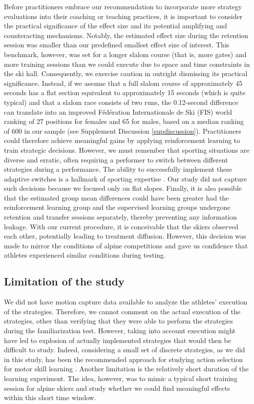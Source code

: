 \documentclass[pdflatex,sn-nature]{sn-jnl}%
\theoremstyle{thmstyleone}%
\theoremstyle{thmstyletwo}%
\theoremstyle{thmstylethree}%
\begin{document}
Before practitioners embrace our recommendation to incorporate more strategy evaluations into their coaching or teaching practices, it is important to consider the practical significance of the effect size and its potential amplifying and counteracting mechanisms\cite{anvari_not_2023}. Notably, the estimated effect size during the retention session was smaller than our predefined smallest effect size of interest. This benchmark, however, was set for a longer slalom course (that is, more gates) and more training sessions than we could execute due to space and time constraints in the ski hall. Consequently, we exercise caution in outright dismissing its practical significance. Instead, if we assume that a full slalom course of approximately 45 seconds has a flat section equivalent to approximately 15 seconds (which is quite typical) and that a slalom race consists of two runs, the 0.12-second difference can translate into an improved Fédération Internationale de Ski (FIS) world ranking of 27 positions for females and 65 for males, based on a median ranking of 600 in our sample (see Supplement Discussion \ref{supdiscussion}). Practitioners could therefore achieve meaningful gains by applying reinforcement learning to train strategic decisions. However, we must remember that sporting situations are diverse and erratic, often requiring a performer to switch between different strategies during a performance. The ability to successfully implement these adaptive switches is a hallmark of sporting expertise  \cite{mangalam_investigating_2023, krakauer_motor_2019, stanley_motor_2013}. Our study did not capture such decisions because we focused only on flat slopes. Finally, it is also possible that the estimated group mean differences could have been greater had the reinforcement learning group and the supervised learning groups undergone retention and transfer sessions separately, thereby preventing any information leakage. With our current procedure, it is conceivable that the skiers observed each other, potentially leading to treatment diffusion. However, this decision was made to mirror the conditions of alpine competitions and gave us confidence that athletes experienced similar conditions during testing.


\subsection{Limitation of the study}
We did not have motion capture data available to analyze the athletes' execution of the strategies. Therefore, we cannot comment on the actual execution of the strategies, other than verifying that they were able to perform the strategies during the familiarization test. However, taking into account execution might have led to explosion of actually implemented strategies that would then be difficult to study. Indeed, considering a small set of discrete strategies, as we did in this study, has been the recommended approach for studying action selection for motor skill learning \cite{taylor_role_2012, taylor_flexible_2011}. Another limitation is the relatively short duration of the learning experiment. The idea, however, was to mimic a typical short training session for alpine skiers and study whether we could find meaningful effects within this short time window.
\end{document}
